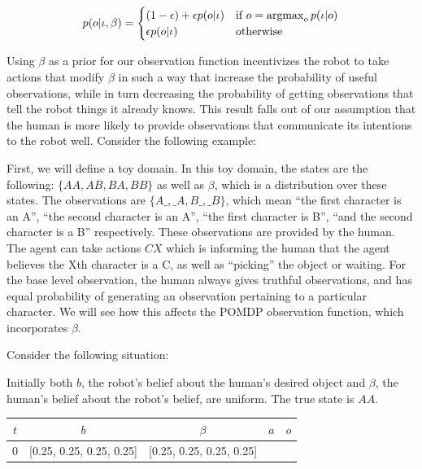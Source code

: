 \documentclass[conference]{IEEEtran}
\newcommand{\argmax}{\operatornamewithlimits{argmax}}
\begin{document}
\begin{equation*} 
	p(o | \iota, \beta) = \begin{cases}
		(1-\epsilon) + \epsilon p(o|\iota) & \text{if } o = \argmax_o p(\iota|o) \\
		\epsilon p(o|\iota) & \text{otherwise}
	\end{cases}
\end{equation*}

Using $\beta$ as a prior for our observation function incentivizes the robot to take actions that modify $\beta$ in such a way that increase the probability of useful observations, while in turn decreasing the probability of getting observations that tell the robot things it already knows. This result falls out of our assumption that the human is more likely to provide observations that communicate its intentions to the robot well. Consider the following example: 


First, we will define a toy domain. In this toy domain, the states are the following: $\{AA, AB, BA, BB\}$ as well as $\beta$, which is a distribution over these states. The observations are $\{A\_, \_A, B\_, \_B\}$, which mean ``the first character is an A'', ``the second character is an A'', ``the first character is B'', ``and the second character is a B'' respectively. These observations are provided by the human. The agent can take actions $CX$ which is informing the human that the agent believes the Xth character is a C, as well as ``picking'' the object or waiting. For the base level observation, the human always gives truthful observations, and has equal probability of generating an observation pertaining to a particular character. We will see how this affects the POMDP observation function, which incorporates $\beta$. 

Consider the following situation: 

Initially both $b$, the robot's belief about the human's desired object and $\beta$, the human's belief about the robot's belief, are uniform. The true state is $AA$. 

\begin{center}
	\footnotesize
\begin{tabular}{|c| c| c| c | c|}
	\hline
	$t$ & $b$ & $\beta$ & $a$ & $o$ \\
	\hline
	$0$ & [0.25, 0.25, 0.25, 0.25] & [0.25, 0.25, 0.25, 0.25] & & \\
	\hline
\end{tabular}
\end{center}
\end{document}
